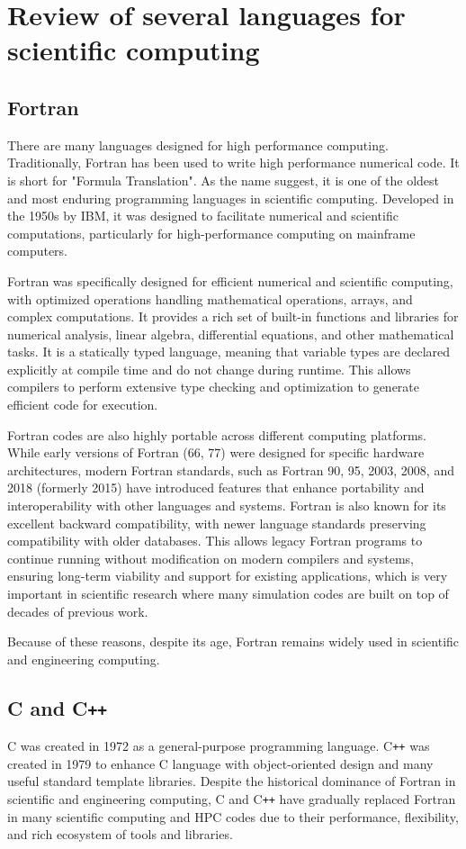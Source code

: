 \section{Review of several languages for scientific computing}
\subsection{Fortran}
There are many languages designed for high performance computing.
Traditionally, Fortran has been used to write high performance numerical code.
It is short for "Formula Translation". As the name suggest, it is one of the oldest and most enduring programming languages in scientific computing.
Developed in the 1950s by IBM, it was designed to facilitate numerical and scientific computations, particularly for high-performance computing on mainframe computers.

Fortran was specifically designed for efficient numerical and scientific computing, with optimized operations handling mathematical operations, arrays, and complex computations.
It provides a rich set of built-in functions and libraries for numerical analysis, linear algebra, differential equations, and other mathematical tasks.
It is a statically typed language, meaning that variable types are declared explicitly at compile time and do not change during runtime. This allows compilers to perform extensive type checking and optimization to generate efficient code for execution.

Fortran codes are also highly portable across different computing platforms. While early versions of Fortran (66, 77) were designed for specific hardware architectures, modern Fortran standards, such as Fortran 90, 95, 2003, 2008, and 2018 (formerly 2015) have introduced features that enhance portability and interoperability with other languages and systems. Fortran is also known for its excellent backward compatibility, with newer language standards preserving compatibility with older databases.
This allows legacy Fortran programs to continue running without modification on modern compilers and systems, ensuring long-term viability and support for existing applications, which is very important in scientific research where many simulation codes are built on top of decades of previous work.

Because of these reasons, despite its age, Fortran remains widely used in scientific and engineering computing.

\subsection{C and C\texttt{++}}
C was created in 1972 as a general-purpose programming language. C\texttt{++} was created in 1979 to enhance C language with object-oriented design and many useful standard template libraries.
Despite the historical dominance of Fortran in scientific and engineering computing, C and C\texttt{++} have gradually replaced Fortran in many scientific computing and HPC codes due to their performance, flexibility, and rich ecosystem of tools and libraries.

